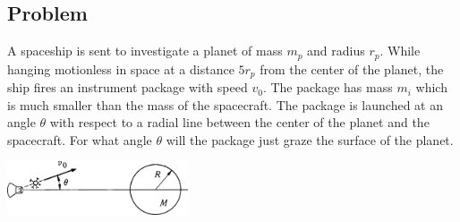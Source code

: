 \documentclass[solutions]{esg8012pset}
\begin{document}
\subsection{Problem}
  A spaceship is sent to investigate a planet of mass $m_p$ and radius $r_p$. While hanging motionless in space at a distance $5 r_p$ from the center of the planet, the ship fires an instrument package with speed $v_0$. The package has mass $m_i$ which is much smaller than the mass of the spacecraft. The package is launched at an angle $\theta$ with respect to a radial line between the center of the planet and the spacecraft. For what angle $\theta$ will the package just graze the surface of the planet.
  \begin{center}\includegraphics[width=0.4\textwidth]{ps08_2}\end{center}
\end{document}
